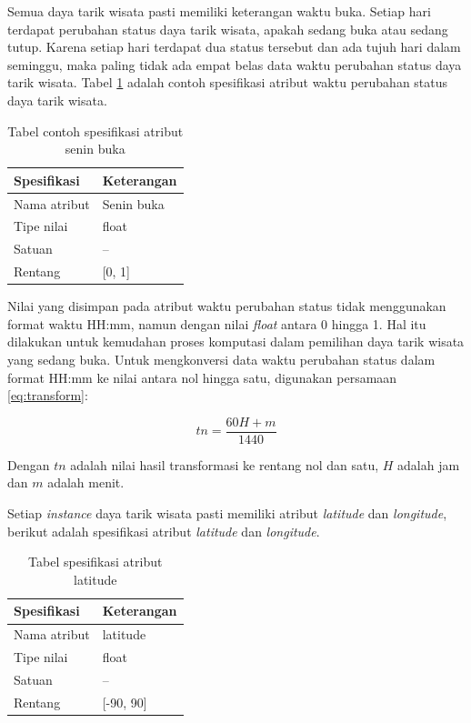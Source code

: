 Semua daya tarik wisata pasti memiliki keterangan waktu buka. Setiap hari terdapat perubahan status daya tarik wisata, apakah sedang buka atau sedang tutup.
Karena setiap hari terdapat dua status tersebut dan ada tujuh hari dalam seminggu, maka paling tidak ada empat belas data waktu perubahan status daya tarik wisata.
Tabel \ref{table:timeattribute} adalah contoh spesifikasi atribut waktu perubahan status daya tarik wisata.
 
\begin{table}[h]
\begin{center}
\begin{tabular}{ |l|m{8cm}| } 
\hline
	\textbf{Spesifikasi} & \textbf{Keterangan}\\
	\hline
	Nama atribut & Senin buka\\
	\hline
	Tipe nilai & float\\
	\hline
	Satuan & --\\
	\hline
	Rentang & [0, 1]\\
	\hline
\end{tabular}
\end{center}
\caption{Tabel contoh spesifikasi atribut senin buka}
\label{table:timeattribute}
\end{table}

Nilai yang disimpan pada atribut waktu perubahan status tidak menggunakan format waktu HH:mm, namun dengan nilai \textit{float} antara 0 hingga 1. Hal itu dilakukan
untuk kemudahan proses komputasi dalam pemilihan daya tarik wisata yang sedang buka. Untuk mengkonversi data waktu perubahan status dalam
format HH:mm ke nilai antara nol hingga satu, digunakan persamaan \ref{eq:transform}:

\begin{equation}
tn = \frac{60H + m}{1440}
\label{eq:transform} 
\end{equation}

Dengan $tn$ adalah nilai hasil transformasi ke rentang nol dan satu, $H$ adalah jam dan $m$ adalah menit.
\par
Setiap \textit{instance} daya tarik wisata pasti memiliki atribut \textit{latitude} dan \textit{longitude}, berikut adalah spesifikasi
atribut \textit{latitude} dan \textit{longitude}.
\begin{table}[h]
\begin{center}
\begin{tabular}{ |l|m{8cm}| } 
\hline
	\textbf{Spesifikasi} & \textbf{Keterangan}\\
	\hline
	Nama atribut & latitude \\
	\hline
	Tipe nilai & float\\
	\hline
	Satuan & --\\
	\hline
	Rentang & [-90, 90]\\
	\hline
\end{tabular}
\end{center}
\caption{Tabel spesifikasi atribut latitude}
\label{table:latitude}
\end{table}


